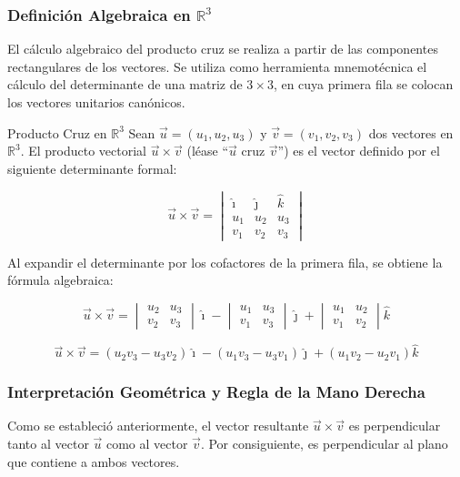 \subsubsection{Definición Algebraica en $\mathbb{R}^3$}

El cálculo algebraico del producto cruz se realiza a partir de las componentes rectangulares de los vectores. Se utiliza como herramienta mnemotécnica el cálculo del determinante de una matriz de $3 \times 3$, en cuya primera fila se colocan los vectores unitarios canónicos.

\begin{mydefinition}{Producto Cruz en $\mathbb{R}^3$}
Sean $\vec{u} = (u_1, u_2, u_3)$ y $\vec{v} = (v_1, v_2, v_3)$ dos vectores en $\mathbb{R}^3$. El producto vectorial $\vec{u} \times \vec{v}$ (léase ``$\vec{u}$ cruz $\vec{v}$'') es el vector definido por el siguiente determinante formal:

\[ \vec{u} \times \vec{v} = \begin{vmatrix} 
\hat{\imath} & \hat{\jmath} & \hat{k} \\ 
u_1 & u_2 & u_3 \\ 
v_1 & v_2 & v_3 
\end{vmatrix} \]

Al expandir el determinante por los cofactores de la primera fila, se obtiene la fórmula algebraica:

\[ \vec{u} \times \vec{v} = \begin{vmatrix} u_2 & u_3 \\ v_2 & v_3 \end{vmatrix}\hat{\imath} - \begin{vmatrix} u_1 & u_3 \\ v_1 & v_3 \end{vmatrix}\hat{\jmath} + \begin{vmatrix} u_1 & u_2 \\ v_1 & v_2 \end{vmatrix}\hat{k} \]

\[ \vec{u} \times \vec{v} = (u_2v_3 - u_3v_2)\hat{\imath} - (u_1v_3 - u_3v_1)\hat{\jmath} + (u_1v_2 - u_2v_1)\hat{k} \]
\end{mydefinition}

\subsubsection{Interpretación Geométrica y Regla de la Mano Derecha}

Como se estableció anteriormente, el vector resultante $\vec{u} \times \vec{v}$ es perpendicular tanto al vector $\vec{u}$ como al vector $\vec{v}$. Por consiguiente, es perpendicular al plano que contiene a ambos vectores.

